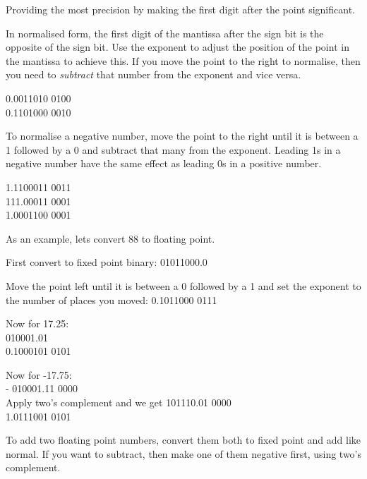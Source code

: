 \documentclass[../main.tex]{subfile}
\begin{document}

Providing the most precision by making the first digit after the point significant.

In normalised form, the first digit of the mantissa after the sign bit is the opposite of the sign bit. Use the exponent to adjust the position of the point in the mantissa to achieve this. If you move the point to the right to normalise, then you need to \textit{subtract} that number from the exponent and vice versa.

0.0011010 0100\\
0.1101000 0010

To normalise a negative number, move the point to the right until it is between a 1 followed by a 0 and subtract that many from the exponent. Leading 1s in a negative number have the same effect as leading 0s in a positive number.

1.1100011 0011\\
111.00011 0001\\
1.0001100 0001


As an example, lets convert 88 to floating point.

First convert to fixed point binary:
01011000.0

Move the point left until it is between a 0 followed by a 1 and set the exponent to the number of places you moved: 0.1011000 0111

Now for 17.25:\\
010001.01\\
0.1000101 0101

Now for -17.75:\\
- 010001.11 0000\\
Apply two's complement and we get 101110.01 0000\\
1.0111001 0101


To add two floating point numbers, convert them both to fixed point and add like normal. If you want to subtract, then make one of them negative first, using two's complement.
\end{document}
